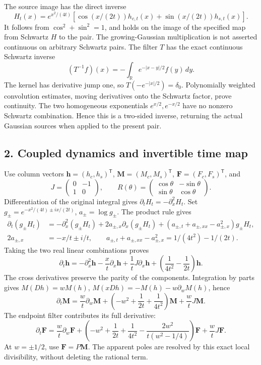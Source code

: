 \documentclass[
  10pt,
  a4paper,
]{article}
\begin{document}
The source image has the direct inverse \[
H_t(x)=e^{x^2/(4t)}
[\cos(x/(2t))h_{c,t}(x)+\sin(x/(2t))h_{s,t}(x)].
\tag{EPM10}
\] It follows from \(\cos^2+\sin^2=1\), and holds on the image of the
specified map from Schwartz \(H\) to the pair. The growing-Gaussian
multiplication is not asserted continuous on arbitrary Schwartz pairs.
The filter \(T\) has the exact continuous Schwartz inverse \[
(T^{-1}f)(x)=-\int_{\mathbb R}e^{-|x-y|/2}f(y)\,dy.
\tag{EPM11}
\] The kernel has derivative jump one, so \(T(-e^{-|x|/2})=\delta_0\).
Polynomially weighted convolution estimates, moving derivatives onto the
Schwartz factor, prove continuity. The two homogeneous exponentials
\(e^{x/2},e^{-x/2}\) have no nonzero Schwartz combination. Hence this is
a two-sided inverse, returning the actual Gaussian sources when applied
to the present pair.

\subsection{2. Coupled dynamics and invertible time
map}\label{coupled-dynamics-and-invertible-time-map}

Use column vectors \(\mathbf h=(h_c,h_s)^{\mathsf T}\),
\(\mathbf M=(M_c,M_s)^{\mathsf T}\),
\(\mathbf F=(F_c,F_s)^{\mathsf T}\), and \[
J=\begin{pmatrix}0&-1\\1&0\end{pmatrix},\qquad
R(\theta)=\begin{pmatrix}\cos\theta&-\sin\theta\\\sin\theta&\cos\theta\end{pmatrix}.
\tag{EPM12}
\] Differentiation of the original integral gives
\(\partial_tH_t=-\partial_x^2H_t\). Set
\(g_\pm=e^{-x^2/(4t)\pm ix/(2t)}\), \(a_\pm=\log g_\pm\). The product
rule gives \[
\begin{aligned}
\partial_t(g_\pm H_t)&=-\partial_x^2(g_\pm H_t)
+2a_{\pm,x}\partial_x(g_\pm H_t)
+(a_{\pm,t}+a_{\pm,xx}-a_{\pm,x}^2)g_\pm H_t,\\
2a_{\pm,x}&=-x/t\pm i/t,\qquad
a_{\pm,t}+a_{\pm,xx}-a_{\pm,x}^2=1/(4t^2)-1/(2t).
\end{aligned}\tag{EPM13}
\] Taking the two real linear combinations proves \[
\partial_t\mathbf h
=-\partial_x^2\mathbf h-\frac{x}{t}\partial_x\mathbf h
+\frac1tJ\partial_x\mathbf h+
\left(\frac1{4t^2}-\frac1{2t}\right)\mathbf h .
\tag{EPM14}
\] The cross derivatives preserve the parity of the components.
Integration by parts gives \(M(Dh)=wM(h)\),
\(M(xDh)=-M(h)-w\partial_wM(h)\), hence \[
\partial_t\mathbf M
=\frac wt\partial_w\mathbf M+
\left(-w^2+\frac1{2t}+\frac1{4t^2}\right)\mathbf M
+\frac wtJ\mathbf M .
\tag{EPM15}
\] The endpoint filter contributes its full derivative: \[
\partial_t\mathbf F
=\frac wt\partial_w\mathbf F+
\left(-w^2+\frac1{2t}+\frac1{4t^2}
-\frac{2w^2}{t(w^2-1/4)}\right)\mathbf F
+\frac wtJ\mathbf F .
\tag{EPM16}
\] At \(w=\pm1/2\), use \(\mathbf F=P\mathbf M\). The apparent poles are
resolved by this exact local divisibility, without deleting the rational
term.
\end{document}
